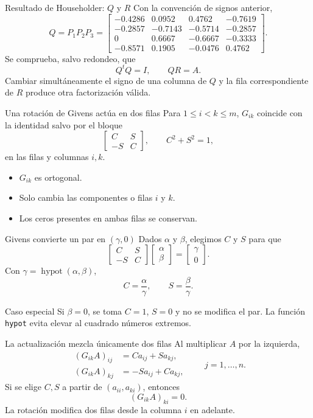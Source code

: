 \documentclass[aspectratio=169,12pt]{beamer}
\newcommand{\mat}[1]{\begin{bmatrix}#1\end{bmatrix}}
\begin{document}
\begin{frame}{Resultado de Householder: $Q$ y $R$}
Con la convención de signos anterior,
\[
Q=P_1P_2P_3=
\mat{
-0.4286&0.0952&0.4762&-0.7619\\
-0.2857&-0.7143&-0.5714&-0.2857\\
0&0.6667&-0.6667&-0.3333\\
-0.8571&0.1905&-0.0476&0.4762}.
\]
Se comprueba, salvo redondeo, que
\[
Q^tQ=I,
\qquad
QR=A.
\]
Cambiar simultáneamente el signo de una columna de $Q$ y la fila correspondiente
de $R$ produce otra factorización válida.
\end{frame}

\begin{frame}{Una rotación de Givens actúa en dos filas}
Para $1\leq i<k\leq m$, $G_{ik}$ coincide con la identidad salvo por el bloque
\[
\mat{C&S\\-S&C},
\qquad C^2+S^2=1,
\]
en las filas y columnas $i,k$.
\begin{itemize}
  \item $G_{ik}$ es ortogonal.
  \item Solo cambia las componentes o filas $i$ y $k$.
  \item Los ceros presentes en ambas filas se conservan.
\end{itemize}
\end{frame}

\begin{frame}{Givens convierte un par en $(\gamma,0)$}
Dados $\alpha$ y $\beta$, elegimos $C$ y $S$ para que
\[
\mat{C&S\\-S&C}\mat{\alpha\\\beta}
=\mat{\gamma\\0}.
\]
Con $\gamma=\operatorname{hypot}(\alpha,\beta)$,
\[
C=\frac{\alpha}{\gamma},
\qquad
S=\frac{\beta}{\gamma}.
\]
\begin{block}{Caso especial}
Si $\beta=0$, se toma $C=1$, $S=0$ y no se modifica el par.
La función \texttt{hypot} evita elevar al cuadrado números extremos.
\end{block}
\end{frame}

\begin{frame}{La actualización mezcla únicamente dos filas}
Al multiplicar $A$ por la izquierda,
\[
\begin{aligned}
(G_{ik}A)_{ij}&=C a_{ij}+S a_{kj},\\
(G_{ik}A)_{kj}&=-S a_{ij}+C a_{kj},
\end{aligned}
\qquad j=1,\ldots,n.
\]
Si se elige $C,S$ a partir de $(a_{ii},a_{ki})$, entonces
\[
(G_{ik}A)_{ki}=0.
\]
La rotación modifica dos filas desde la columna $i$ en adelante.
\end{frame}
\end{document}
